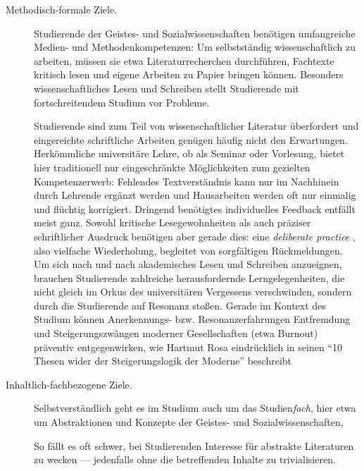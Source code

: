 \documentclass[11pt,a4paper,oneside]{article}
\begin{document}
\begin{description}
	\item[Methodisch-formale Ziele.]
		Studierende der Geistes- und Sozialwissenschaften benötigen umfangreiche Medien- und Methodenkompetenzen: Um selbstständig wissenschaftlich zu arbeiten, müssen sie etwa Literaturrecherchen durchführen, Fachtexte kritisch lesen und eigene Arbeiten zu Papier bringen können.
		Besonders wissenschaftliches Lesen und Schreiben stellt Studierende mit fortschreitendem Studium vor Probleme.

		Studierende sind zum Teil von wissenschaftlicher Literatur überfordert und eingereichte schriftliche Arbeiten genügen häufig nicht den Erwartungen.
		Herkömmliche universitäre Lehre, ob als Seminar oder Vorlesung, bietet hier traditionell nur eingeschränkte Möglichkeiten zum gezielten Kompetenzerwerb: Fehlendes Textverständnis kann nur im Nachhinein durch Lehrende ergänzt werden und Hausarbeiten werden oft nur einmalig und flüchtig korrigiert.
		Dringend benötigtes individuelles Feedback entfällt meist ganz.
		Sowohl kritische Lesegewohnheiten als auch präziser schriftlicher Ausdruck benötigen aber gerade dies: eine \emph{deliberate practice} \parencite{Ericsson2007}, also vielfache Wiederholung, begleitet von sorgfältigen Rückmeldungen.
		Um sich nach und nach akademisches Lesen und Schreiben anzueignen, brauchen Studierende zahlreiche herausfordernde Lerngelegenheiten, die nicht gleich im Orkus des universitären Vergessens verschwinden, sondern durch die Studierende auf Resonanz stoßen.
		Gerade im Kontext des Studium können Anerkennungs- bzw. Resonanzerfahrungen Entfremdung und Steigerungszwängen moderner Gesellschaften (etwa Burnout) präventiv entgegenwirken, wie Hartmut Rosa eindrücklich in seinen ``10 Thesen wider der Steigerungslogik der Moderne'' beschreibt \cite{Rosa-Paech-etal-2014}

	\item[Inhaltlich-fachbezogene Ziele.]
		Selbstverständlich geht es im Studium auch um das Studien\emph{fach}, hier etwa um Abstraktionen und Konzepte der Geistes- und Sozialwissenschaften,

		So fällt es oft schwer, bei Studierenden Interesse für abstrakte Literaturen zu wecken --- jedenfalls ohne die betreffenden Inhalte zu trivialisieren.


\end{description}
\end{document}
